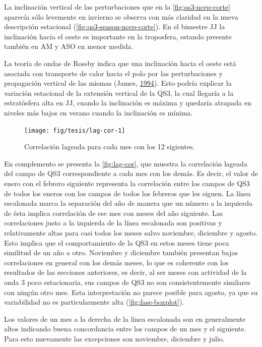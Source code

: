 \documentclass[spanish,a4paper,12pt,oneside]{book}
\begin{document}
La inclinación vertical de las perturbaciones que en la
\autoref{fig:qs3-ncep-corte} aparecía sólo levemente en invierno se
observa con más claridad en la nueva descripción estacional
(\autoref{fig:qs3-season-ncep-corte}). En el bimestre JJ la inclinación
hacia el oeste es importante en la troposfera, estando presente también
en AM y ASO en menor medida.

La teoría de ondas de Rossby indica que una inclinación hacia el oeste
está asociada con transporte de calor hacia el polo por las
perturbaciones y propagación vertical de las mismas (James,
\protect\hyperlink{ref-James}{1994}). Esto podría explicar la variación
estacional de la extensión vertical de la QS3, la cual llegaría a la
estratósfera alta en JJ, cuando la inclinación es máxima y quedaría
atrapada en niveles más bajos en verano cuando la inclinación es mínima.

\begin{figure}
\texttt{[image: fig/tesis/lag-cor-1]} \caption{Correlación lageada para cada mes con los 12 sigientes.}\label{fig:lag-cor}
\end{figure}

En complemento se presenta la \autoref{fig:lag-cor}, que muestra la
correlación lageada del campo de QS3 correspondiente a cada mes con los
demás. Es decir, el valor de enero con el febrero siguiente representa
la correlación entre los campos de QS3 de todos los eneros con los
campos de todos los febreros que les siguen. La línea escalonada marca
la separación del año de manera que un número a la izquierda de ésta
implica correlación de ese mes con meses del año siguiente. Las
correlaciones justo a la izquierda de la línea escalonada son positivas
y relativamente altas para casi todos los meses salvo noviembre,
diciembre y agosto. Esto implica que el comportamiento de la QS3 en
estos meses tiene poca similitud de un año a otro. Noviembre y diciembre
también presentan bajas correlaciones en general con los demás meses, lo
que es coherente con los resultados de las secciones anteriores, es
decir, al ser meses con actividad de la onda 3 poco estacionaria, sus
campos de QS3 no son consistentemente similares con ningún otro mes.
Esta interpretación no parece posible para agosto, ya que su
variabilidad no es particularmente alta (\autoref{fig:fase-boxplot}).

Los valores de un mes a la derecha de la línea escalonada son en
generalmente altos indicando buena concordancia entre los campos de un
mes y el siguiente. Para esto nuevamente las excepciones son noviembre,
diciembre y julio.
\end{document}
